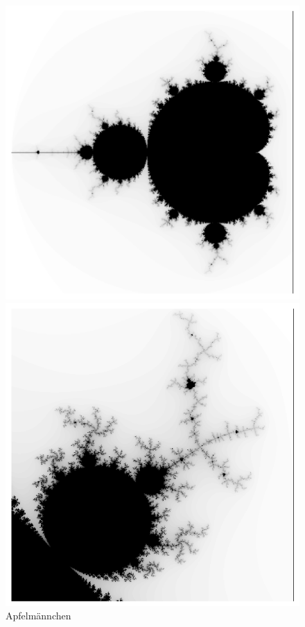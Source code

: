 \begin{figure}[H]
  \includegraphics[width=\linewidth]{img/Mandelbrot.pdf}
  \caption{\newline Apfelmännchen \newline}\label{fig:apfelmannchen}
  \endminipage\hfill
  \includegraphics[width=\linewidth]{img/MandelbrotZoomed.pdf}

\end{figure}
